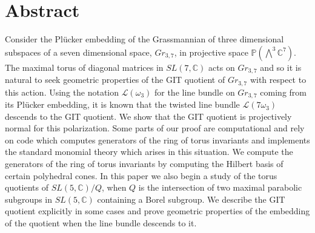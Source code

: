 \section{Abstract}\label{s.abstract}

Consider the Pl\"{u}cker embedding of the Grassmannian of three dimensional subspaces of a seven dimensional space, $Gr_{3,7}$, in projective space ${\mathbb P}(\bigwedge^3 {\mathbb C}^7 )$. The maximal torus of diagonal matrices in $SL(7,{\mathbb C})$ acts on $Gr_{3,7}$ and so it is natural to seek geometric properties of the GIT quotient of $Gr_{3,7}$ with respect to this action. Using the notation ${\mathcal L}(\omega_3)$ for the line bundle on $Gr_{3,7}$ coming from its Pl\"{u}cker embedding, it is known that the twisted line bundle ${\mathcal L}(7\omega_3)$ descends to the GIT quotient. We show that the GIT quotient is projectively normal for this polarization.  Some parts of our proof are computational and rely on code which computes generators of the ring of torus invariants and implements the standard monomial theory which arises in this situation. We compute the generators of the ring of torus invariants by computing the Hilbert basis of certain polyhedral cones. 
 In this paper we also begin a study of the torus quotients of $SL(5,{\mathbb C})/Q$, when $Q$ is the 
intersection of two maximal parabolic subgroups in $SL(5,{\mathbb C})$ containing a Borel subgroup. We describe the GIT quotient explicitly in some cases and prove geometric properties of the embedding of the quotient when the line bundle descends to it.